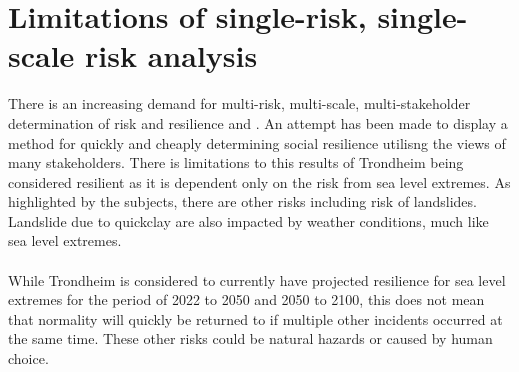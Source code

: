 \section{Limitations of single-risk, single-scale risk analysis}
There is an increasing demand for multi-risk, multi-scale, multi-stakeholder determination of risk and resilience \cite{gerkensmeier_governing_2018} and \cite{cutter_community_2020}. An attempt has been made to display a method for quickly and cheaply determining social resilience utilisng the views of many stakeholders. There is limitations to this results of Trondheim being considered resilient as it is dependent only on the risk from sea level extremes. As highlighted by the subjects, there are other risks including risk of landslides. Landslide due to quickclay are also impacted by weather conditions, much like sea level extremes. 
\paragraph{}

While Trondheim is considered to currently have projected resilience for sea level extremes for the period of 2022 to 2050 and 2050 to 2100, this does not mean that normality will quickly be returned to if multiple other incidents occurred at the same time. These other risks could be natural hazards or caused by human choice. 